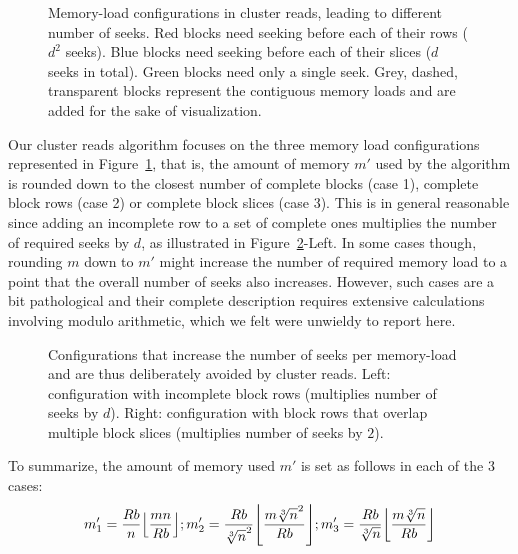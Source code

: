 \documentclass[10pt, conference, compsocconf]{IEEEtran}
\DeclarePairedDelimiter{\floor}{\lfloor}{\rfloor}
\begin{document}
\begin{figure}
\centering
\def\svgwidth{0.3\columnwidth}

\def\svgwidth{0.3\columnwidth}

\def\svgwidth{0.3\columnwidth}

\caption{Memory-load configurations in cluster reads, leading to
  different number of seeks. Red blocks need seeking before each of
  their rows ($d^2$ seeks). Blue blocks need seeking before each of
  their slices ($d$ seeks in total). Green blocks need only a single
  seek. Grey, dashed, transparent blocks represent the contiguous
  memory loads and are added for the sake of visualization.}
\label{fig:cluster-reads}
\end{figure}
Our cluster reads algorithm focuses on the three memory load
configurations represented in Figure~\ref{fig:cluster-reads}, that is,
the amount of memory $m'$ used by the algorithm is rounded down to the
closest number of complete blocks (case 1), complete block rows (case
2) or complete block slices (case 3). This is in general reasonable
since adding an incomplete row to a set of complete ones multiplies
the number of required seeks by $d$, as illustrated in
Figure~\ref{fig:avoided-configurations}-Left. In some cases though,
rounding $m$ down to $m'$ might increase the number of required
memory load to a point that the overall number of seeks also
increases. However, such cases are a bit pathological and their
complete description requires extensive calculations involving modulo
arithmetic, which we felt were unwieldy to report here.
\begin{figure}
  \centering
\def\svgwidth{0.3\columnwidth}

\hfill
\def\svgwidth{0.3\columnwidth}

\caption{Configurations that increase the number of seeks per
  memory-load and are thus deliberately avoided by cluster
  reads. Left: configuration with incomplete block rows (multiplies
  number of seeks by $d$). Right: configuration with block rows that
  overlap multiple block slices (multiplies number of seeks by $2$).}
\label{fig:avoided-configurations}
\end{figure}
To summarize, the amount of memory used $m'$ is set as follows in each of the 3 cases:
\begin{equation*}
  m_1' = \frac{Rb}{n}\floor*{\frac{mn}{Rb}};
  m_2' = \frac{Rb}{\sqrt[3]{n}^2}\floor*{\frac{m\sqrt[3]{n}^2}{Rb}};
  m_3' = \frac{Rb}{\sqrt[3]{n}}\floor*{\frac{m\sqrt[3]{n}}{Rb}}
\end{equation*}
\end{document}
